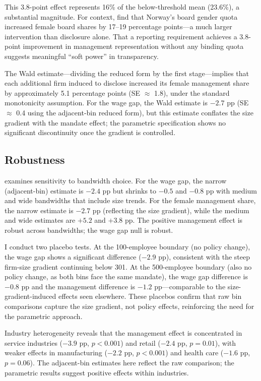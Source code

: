 \documentclass[12pt]{article}
\begin{document}
This 3.8-point effect represents 16\% of the below-threshold mean (23.6\%), a substantial magnitude. For context, \citet{bertrand2018} find that Norway's board gender quota increased female board shares by 17--19 percentage points---a much larger intervention than disclosure alone. That a reporting requirement achieves a 3.8-point improvement in management representation without any binding quota suggests meaningful ``soft power'' in transparency.

The Wald estimate---dividing the reduced form by the first stage---implies that each additional firm induced to disclose increased its female management share by approximately 5.1 percentage points (SE $\approx$ 1.8), under the standard monotonicity assumption. For the wage gap, the Wald estimate is $-2.7$ pp (SE $\approx$ 0.4 using the adjacent-bin reduced form), but this estimate conflates the size gradient with the mandate effect; the parametric specification shows no significant discontinuity once the gradient is controlled.

\subsection{Robustness}



 examines sensitivity to bandwidth choice. For the wage gap, the narrow (adjacent-bin) estimate is $-2.4$ pp but shrinks to $-0.5$ and $-0.8$ pp with medium and wide bandwidths that include size trends. For the female management share, the narrow estimate is $-2.7$ pp (reflecting the size gradient), while the medium and wide estimates are $+5.2$ and $+3.8$ pp. The positive management effect is robust across bandwidths; the wage gap null is robust.

I conduct two placebo tests. At the 100-employee boundary (no policy change), the wage gap shows a significant difference ($-2.9$ pp), consistent with the steep firm-size gradient continuing below 301. At the 500-employee boundary (also no policy change, as both bins face the same mandate), the wage gap difference is $-0.8$ pp and the management difference is $-1.2$ pp---comparable to the size-gradient-induced effects seen elsewhere. These placebos confirm that raw bin comparisons capture the size gradient, not policy effects, reinforcing the need for the parametric approach.

Industry heterogeneity reveals that the management effect is concentrated in service industries ($-3.9$ pp, $p < 0.001$) and retail ($-2.4$ pp, $p = 0.01$), with weaker effects in manufacturing ($-2.2$ pp, $p < 0.001$) and health care ($-1.6$ pp, $p = 0.06$). The adjacent-bin estimates here reflect the raw comparison; the parametric results suggest positive effects within industries.
\end{document}
